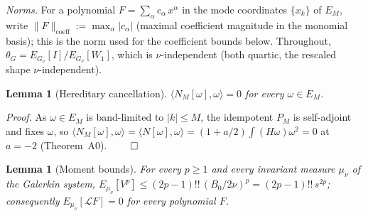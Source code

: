 \documentclass[11pt]{article}
\newtheorem{lemma}[theorem]{Lemma}
\theoremstyle{remark}
\theoremstyle{plain}
\newcommand{\eqdef}{:=}
\begin{document}
\emph{Norms.} For a polynomial $F = \sum_\alpha c_\alpha\, x^\alpha$ in the mode
coordinates $\{x_k\}$ of $E_M$, write $\|F\|_{\mathrm{coeff}} \eqdef \max_\alpha |c_\alpha|$
(maximal coefficient magnitude in the monomial basis); this is the norm used for the
coefficient bounds below. Throughout, $\theta_G = E_{G_\nu}[I]/E_{G_\nu}[W_1]$,
which is $\nu$-independent (both quartic, the rescaled shape $\nu$-independent).

\begin{lemma}[Hereditary cancellation]\label{lem:appfact0}
$\langle N_M[\omega],\omega\rangle = 0$ for every $\omega \in E_M$.
\end{lemma}

\emph{Proof.} As $\omega \in E_M$ is band-limited to $|k|\le M$, the idempotent $P_M$ is self-adjoint
and fixes $\omega$, so $\langle N_M[\omega],\omega\rangle = \langle N[\omega],\omega\rangle
= (1+a/2)\int(H\omega)\omega^2 = 0$ at $a=-2$ (Theorem~A0). $\qed$

\begin{lemma}[Moment bounds]\label{lem:appmoments}
For every $p \ge 1$ and every invariant measure $\mu_\nu$ of the Galerkin system,
$E_{\mu_\nu}[V^p] \le (2p-1)!!\,(B_0/2\nu)^p = (2p-1)!!\,s^{2p}$; consequently $E_{\mu_\nu}[\mathcal{L}F]=0$
for every polynomial $F$.
\end{lemma}
\end{document}
